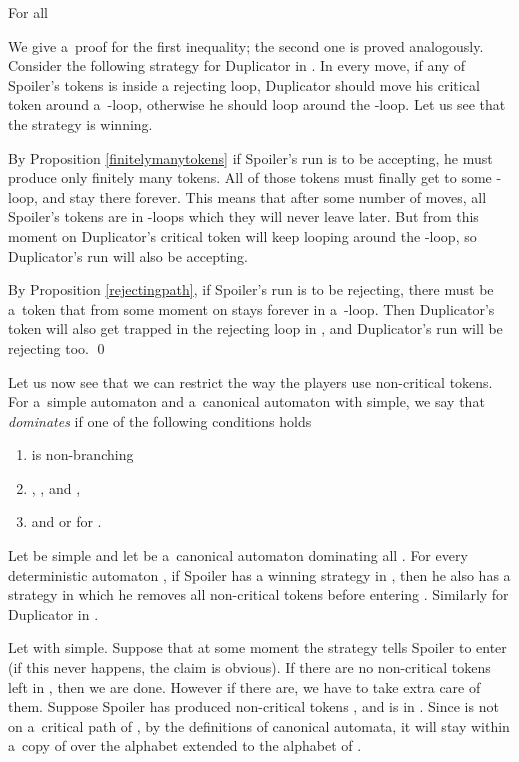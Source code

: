 \documentclass{LMCS}
\begin{document}
\begin{lem} \label{CD1} 
For all  
\end{lem}

\proof We give a~proof for the first inequality; the second one is proved analogously. Consider the following strategy for Duplicator in . In every move, if any of Spoiler's tokens is inside a rejecting loop, Duplicator should move his critical token around a~-loop, otherwise he should loop around the -loop. Let us see that the strategy is winning. 

By Proposition \ref{finitelymanytokens} if Spoiler's run is to be accepting, he must produce only finitely many tokens. All of those tokens must finally get to some -loop, and stay there forever. This means that after some number of moves, all Spoiler's tokens are in -loops which they will never leave later. But from this moment on Duplicator's critical token will keep looping around the -loop, so Duplicator's run will also be accepting. 

By Proposition \ref{rejectingpath}, if Spoiler's run is to be rejecting, there must be a~token that from some moment on stays forever in a~-loop. Then Duplicator's token will also get trapped in the rejecting loop in , and Duplicator's run will be rejecting too. \qed

\vspace{5pt}

Let us now see that we can restrict the way the players use non-critical tokens. For a~simple automaton  and a~canonical automaton  with  simple, we say that  {\em dominates}\label{domination}  if one of the following conditions holds
\begin{enumerate}[]
\item  is non-branching
\item ,  , and ,
\item  and  or  for .
\end{enumerate}

\begin{lem} \label{resetrule}
Let  be simple and let  be a~canonical automaton dominating all . For every deterministic automaton , if Spoiler has a winning strategy in , then he also has a strategy in which he removes all non-critical tokens before entering . Similarly for Duplicator in . 
\end{lem} 

\proof Let  with  simple. Suppose that at some moment the strategy tells Spoiler to enter  (if this never happens, the claim is obvious). If there are no non-critical tokens left in , then we are done. However if there are, we have to take extra care of them. Suppose Spoiler has produced non-critical tokens , and  is in . Since  is not on a~critical path of , by the definitions of canonical automata, it will stay within a~copy of  over the alphabet extended to the alphabet of . 
\end{document}
